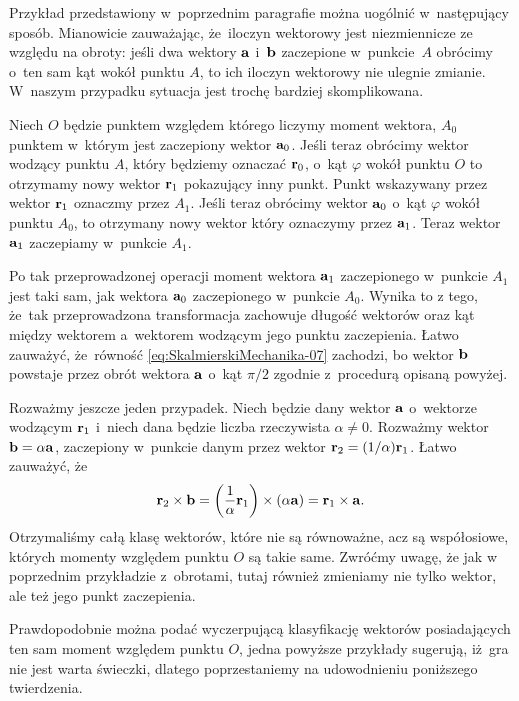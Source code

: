\documentclass[a4paper,11pt]{article}
\begin{document}
Przykład przedstawiony w~poprzednim paragrafie można uogólnić w~następujący
sposób. Mianowicie zauważając, że~iloczyn wektorowy jest niezmiennicze ze
względu na obroty: jeśli dwa wektory $\mathbf{a}$ i~$\mathbf{b}$ zaczepione
w~punkcie~$A$ obrócimy o~ten sam kąt wokół punktu $A$, to ich iloczyn
wektorowy nie ulegnie zmianie. W~naszym przypadku sytuacja jest trochę
bardziej skomplikowana.

Niech $O$ będzie punktem względem którego liczymy moment wektora, $A_{ 0 }$
punktem w~którym jest zaczepiony wektor $\mathbf{a}_{ 0 }$. Jeśli teraz
obrócimy wektor wodzący punktu $A$, który będziemy oznaczać
$\mathbf{r}_{ 0 }$, o~kąt $\varphi$ wokół punktu $O$ to otrzymamy nowy wektor
$\mathbf{r}_{ 1 }$ pokazujący inny punkt. Punkt wskazywany przez wektor
$\mathbf{r}_{ 1 }$ oznaczmy przez $A_{ 1 }$. Jeśli teraz obrócimy wektor
$\mathbf{a}_{ 0 }$ o~kąt $\varphi$ wokół punktu $A_{ 0 }$, to otrzymany nowy wektor
który oznaczymy przez $\mathbf{a}_{ 1 }$. Teraz wektor $\mathbf{a}_{ 1 }$
zaczepiamy w~punkcie $A_{ 1 }$.

Po tak przeprowadzonej operacji moment wektora $\mathbf{a}_{ 1 }$
zaczepionego w~punkcie $A_{ 1 }$ jest taki sam, jak wektora $\mathbf{a}_{ 0 }$
zaczepionego w~punkcie $A_{ 0 }$. Wynika to z tego, że~tak przeprowadzona
transformacja zachowuje długość wektorów oraz kąt między wektorem
a~wektorem wodzącym jego punktu zaczepienia. Łatwo zauważyć, że~równość
\eqref{eq:SkalmierskiMechanika-07} zachodzi, bo wektor $\mathbf{b}$ powstaje
przez obrót wektora $\mathbf{a}$ o~kąt $\pi / 2$ zgodnie z~procedurą opisaną
powyżej.

Rozważmy jeszcze jeden przypadek. Niech będzie dany wektor $\mathbf{a}$
o~wektorze wodzącym $\mathbf{r}_{ 1 }$ i~niech dana będzie liczba rzeczywista
$\alpha \neq 0$. Rozważmy wektor $\mathbf{b} = \alpha \mathbf{a}$, zaczepiony w~punkcie
danym przez wektor $\mathbf{r}_{ 2 } = ( 1 / \alpha ) \mathbf{r}_{ 1 }$. Łatwo
zauważyć, że
\begin{equation}
  \label{eq:SkalmierskiMechanika-08}
  \mathbf{r}_{ 2 } \times \mathbf{b} =
  \left( \frac{ 1 }{ \alpha } \mathbf{r}_{ 1 } \right) \times ( \alpha \mathbf{a} ) =
  \mathbf{r}_{ 1 } \times \mathbf{a}.
\end{equation}
Otrzymaliśmy całą klasę wektorów, które nie są równoważne, acz są
współosiowe, których momenty względem punktu $O$ są takie same. Zwróćmy
uwagę, że jak w poprzednim przykładzie z~obrotami, tutaj również zmieniamy
nie tylko wektor, ale też jego punkt zaczepienia.

Prawdopodobnie można podać wyczerpującą klasyfikację wektorów posiadających
ten sam moment względem punktu $O$, jedna powyższe przykłady sugerują,
iż~gra nie jest warta świeczki, dlatego poprzestaniemy na udowodnieniu
poniższego twierdzenia.
\end{document}
